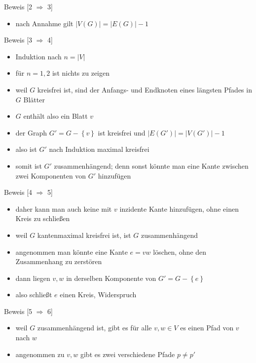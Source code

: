 \documentclass[aspectratio=1610, 11pt]{beamer}
\newcommand\cbc[1]{\left\{{#1}\right\}}
\begin{document}
\begin{frame}
\begin{overprint}
\begin{exampleblock}{Beweis \hfill[2 $\Rightarrow$ 3]}
\begin{itemize}
				\item nach Annahme gilt $|V(G)|=|E(G)|-1$
			\end{itemize}
		\end{exampleblock}
		\begin{exampleblock}{Beweis \hfill[3 $\Rightarrow$ 4]}
			\begin{itemize}
				\item Induktion nach $n=|V|$
				\item f\"ur $n=1,2$ ist nichts zu zeigen
				\item weil $G$ kreisfrei ist, sind der Anfangs- und Endknoten eines l\"angsten Pfades in $G$ Bl\"atter
				\item $G$ enth\"alt also ein Blatt $v$
				\item der Graph $G'=G-\cbc v$ ist kreisfrei und $|E(G')|=|V(G')|-1$
				\item also ist $G'$ nach Induktion maximal kreisfrei
				\item somit ist $G'$ zusammenh\"angend; denn sonst k\"onnte man eine Kante zwischen zwei Komponenten von $G'$ hinzuf\"ugen
			\end{itemize}
		\end{exampleblock}
		\begin{exampleblock}{Beweis \hfill[4 $\Rightarrow$ 5]}
			\begin{itemize}
				\item daher kann man auch keine mit $v$ inzidente Kante hinzuf\"ugen, ohne einen Kreis zu schlie\ss en
				\item weil $G$ kantenmaximal kreisfrei ist, ist $G$ zusammenh\"angend
				\item angenommen man k\"onnte eine Kante $e=vw$ l\"oschen, ohne den Zusammenhang zu zerst\"oren
				\item dann liegen $v,w$ in derselben Komponente von $G'=G-\cbc{e}$
				\item also schlie\ss t $e$ einen Kreis, Widerspruch
			\end{itemize}
		\end{exampleblock}
		\begin{exampleblock}{Beweis \hfill[5 $\Rightarrow$ 6]}
			\begin{itemize}
				\item weil $G$ zusammenh\"angend ist, gibt es f\"ur alle $v,w\in V$ es einen Pfad von $v$ nach $w$
				\item angenommen zu $v,w$ gibt es zwei verschiedene Pfade $p\neq p'$

\end{itemize}
\end{exampleblock}
\end{overprint}
\end{frame}
\end{document}
